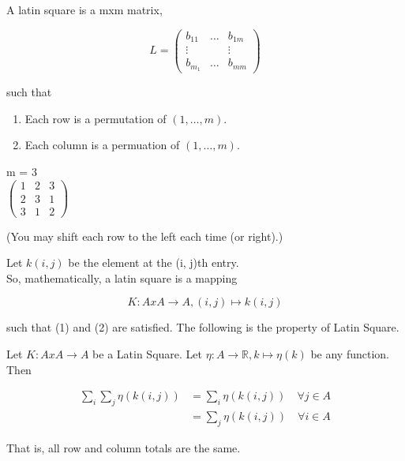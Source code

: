 \documentclass[11pt,fleqn]{book} %
\begin{document}
A latin square is a mxm matrix, 

			
			$$L = \begin{pmatrix}
				b_{11} & \dots & b_{1m}\\
				\vdots & & \vdots \\
				b_{m_1} & \dots & b_{mm}
			\end{pmatrix} $$

such that

	\begin{enumerate}
		\item Each row is a permutation of $(1, \dots, m)$.
		\item Each column is a permuation of $(1, \dots, m)$.
	\end{enumerate}

\begin{example}
	m = 3\\

	$\begin{pmatrix}
			1 & 2 & 3\\
			2 & 3 & 1\\
			3 & 1 & 2
		\end{pmatrix}$

	(You may shift each row to the left each time (or right).)
\end{example}


Let $k(i, j)$ be the element at the (i, j)th entry. \\

So, mathematically, a latin square is a mapping 

		$$K: A x A \rightarrow A, (i, j) \mapsto k(i,j) $$

such that (1) and (2) are satisfied. The following is the property of Latin Square. 

\begin{theorem}
	Let $K: A x A \rightarrow A$ be a Latin Square. Let $\eta: A \rightarrow \mathbb{R},k \mapsto \eta(k) $ be any function. Then

			\begin{align*}
				\sum_i \sum_j \eta(k(i,j)) &= \sum_i \eta(k(i,j))\quad \forall j \in A\\
						&= \sum_j \eta(k(i,j)) \quad \forall i \in A
			\end{align*}  

	That is, all row and column totals are the same. 
\end{theorem}
\end{document}
